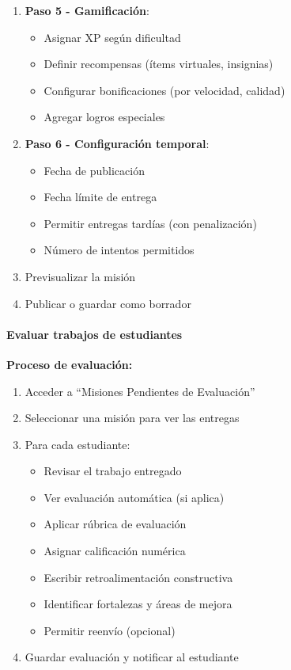 \begin{enumerate}
	\item \textbf{Paso 5 - Gamificación}:
	\begin{itemize}
		\item Asignar XP según dificultad
		\item Definir recompensas (ítems virtuales, insignias)
		\item Configurar bonificaciones (por velocidad, calidad)
		\item Agregar logros especiales
	\end{itemize}
	\item \textbf{Paso 6 - Configuración temporal}:
	\begin{itemize}
		\item Fecha de publicación
		\item Fecha límite de entrega
		\item Permitir entregas tardías (con penalización)
		\item Número de intentos permitidos
	\end{itemize}
	\item Previsualizar la misión
	\item Publicar o guardar como borrador
\end{enumerate}

\paragraph{Evaluar trabajos de estudiantes}

\textbf{Proceso de evaluación:}

\begin{enumerate}
	\item Acceder a ``Misiones Pendientes de Evaluación''
	\item Seleccionar una misión para ver las entregas
	\item Para cada estudiante:
	\begin{itemize}
		\item Revisar el trabajo entregado
		\item Ver evaluación automática (si aplica)
		\item Aplicar rúbrica de evaluación
		\item Asignar calificación numérica
		\item Escribir retroalimentación constructiva
		\item Identificar fortalezas y áreas de mejora
		\item Permitir reenvío (opcional)
	\end{itemize}
	\item Guardar evaluación y notificar al estudiante
\end{enumerate}

